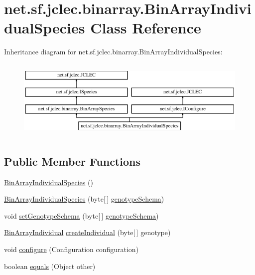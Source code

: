 \hypertarget{classnet_1_1sf_1_1jclec_1_1binarray_1_1_bin_array_individual_species}{\section{net.\-sf.\-jclec.\-binarray.\-Bin\-Array\-Individual\-Species Class Reference}
\label{classnet_1_1sf_1_1jclec_1_1binarray_1_1_bin_array_individual_species}
}
Inheritance diagram for net.\-sf.\-jclec.\-binarray.\-Bin\-Array\-Individual\-Species\-:\begin{figure}[H]
\begin{center}
\leavevmode
\includegraphics[height=3.888889cm]{classnet_1_1sf_1_1jclec_1_1binarray_1_1_bin_array_individual_species}
\end{center}
\end{figure}
\subsection*{Public Member Functions}
\begin{DoxyCompactItemize}
\item 
\hyperlink{classnet_1_1sf_1_1jclec_1_1binarray_1_1_bin_array_individual_species_adf95507b4f49a30ec6c3be36384f6a32}{Bin\-Array\-Individual\-Species} ()
\item 
\hyperlink{classnet_1_1sf_1_1jclec_1_1binarray_1_1_bin_array_individual_species_ad28b73680937e47b71a9c3b45962f38d}{Bin\-Array\-Individual\-Species} (byte\mbox{[}$\,$\mbox{]} \hyperlink{classnet_1_1sf_1_1jclec_1_1binarray_1_1_bin_array_species_ab0e39779362683e78929877e42c7e660}{genotype\-Schema})
\item 
void \hyperlink{classnet_1_1sf_1_1jclec_1_1binarray_1_1_bin_array_individual_species_a2b57176147a22e2dccefc34bfd958234}{set\-Genotype\-Schema} (byte\mbox{[}$\,$\mbox{]} \hyperlink{classnet_1_1sf_1_1jclec_1_1binarray_1_1_bin_array_species_ab0e39779362683e78929877e42c7e660}{genotype\-Schema})
\item 
\hyperlink{classnet_1_1sf_1_1jclec_1_1binarray_1_1_bin_array_individual}{Bin\-Array\-Individual} \hyperlink{classnet_1_1sf_1_1jclec_1_1binarray_1_1_bin_array_individual_species_a45cde066459dffd8e5ef6584b6d55d15}{create\-Individual} (byte\mbox{[}$\,$\mbox{]} genotype)
\item 
void \hyperlink{classnet_1_1sf_1_1jclec_1_1binarray_1_1_bin_array_individual_species_a11ed22273940f1c00b594f155d95e67c}{configure} (Configuration configuration)
\item 
boolean \hyperlink{classnet_1_1sf_1_1jclec_1_1binarray_1_1_bin_array_individual_species_a5038f5bb6531316528ae9be5e078247a}{equals} (Object other)
\end{DoxyCompactItemize}
